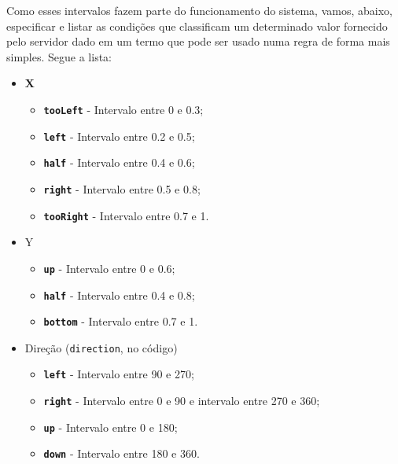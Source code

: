 \documentclass{article}
\begin{document}
        Como esses intervalos fazem parte do funcionamento do sistema, vamos,
        abaixo, especificar e listar as condições que classificam um
        determinado valor fornecido pelo servidor dado em um termo que pode ser
        usado numa regra de forma mais simples. Segue a lista:
        
        \begin{itemize}
            \item \textbf{X}
                \begin{itemize}
                    \item \texttt{\textbf{tooLeft}} - Intervalo entre 0 e 0.3;
                    \item \texttt{\textbf{left}} - Intervalo entre 0.2 e 0.5;
                    \item \texttt{\textbf{half}} - Intervalo entre 0.4 e 0.6;
                    \item \texttt{\textbf{right}} - Intervalo entre 0.5 e 0.8;
                    \item \texttt{\textbf{tooRight}} - Intervalo entre 0.7 e 1.
                \end{itemize}
            
            \item Y 
                \begin{itemize}
                    \item \texttt{\textbf{up}} - Intervalo entre 0 e 0.6;
                    \item \texttt{\textbf{half}} - Intervalo entre 0.4 e 0.8;
                    \item \texttt{\textbf{bottom}} - Intervalo entre 0.7 e 1.
                \end{itemize}

            \item Direção (\texttt{direction}, no código)
                \begin{itemize}
                    \item \texttt{\textbf{left}} - Intervalo entre 90 e 270;
                    \item \texttt{\textbf{right}} - Intervalo entre 0 e 90 e
                        intervalo entre 270 e 360;
                    \item \texttt{\textbf{up}} - Intervalo entre 0 e 180;
                    \item \texttt{\textbf{down}} - Intervalo entre 180 e 360.
                \end{itemize}
        \end{itemize}
        
\end{document}
